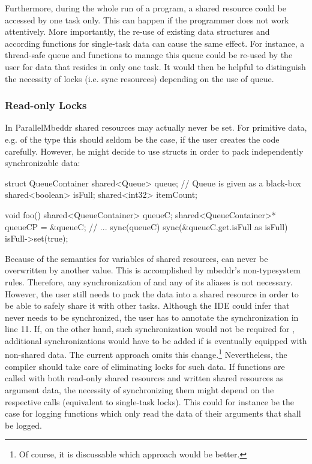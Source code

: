 Furthermore, during the whole run of a program, a shared resource could be accessed by one task only. This can happen if the programmer does not work attentively. More importantly, the re-use of existing data structures and according functions for single-task data can cause the same effect. For instance, a thread-safe queue and functions to manage this queue could be re-used by the user for data that resides in only one task. It would then be helpful to distinguish the necessity of locks (i.e. sync resources) depending on the use of queue.

\subsubsection{Read-only Locks}
In ParallelMbeddr shared resources may actually never be set. For primitive data, e.g. of the type  this should seldom be the case, if the user creates the code carefully. However, he might decide to use structs in order to pack independently synchronizable data:
\begin{ccode}
struct QueueContainer {
  shared<Queue>   queue;     // Queue is given as a black-box
  shared<boolean> isFull;
  shared<int32>   itemCount;
}

void foo() {
  shared<QueueContainer> queueC;
  shared<QueueContainer>* queueCP = &queueC;
  // ...
  sync(queueC) {
    sync(&queueC.get.isFull as isFull) {
      isFull->set(true);
    }
  }
}
\end{ccode}
Because of the semantics for variables of shared resources,  can never be overwritten by another value. This is accomplished by mbeddr's non-typesystem rules. Therefore, any synchronization of  and any of its aliases is not necessary. However, the user still needs to pack the data into a shared resource in order to be able to safely share it with other tasks. Although the IDE could infer that  never needs to be synchronized, the user has to annotate the synchronization in line 11. If, on the other hand, such synchronization would not be required for , additional synchronizations would have to be added if  is eventually equipped with non-shared data. The current approach omits this change.\footnote{Of course, it is discussable which approach would be better.} Nevertheless, the compiler should take care of eliminating locks for such data. If functions are called with both read-only shared resources and written shared resources as argument data, the necessity of synchronizing them might depend on the respective calls (equivalent to single-task locks). This could for instance be the case for logging functions which only read the data of their arguments that shall be logged.


